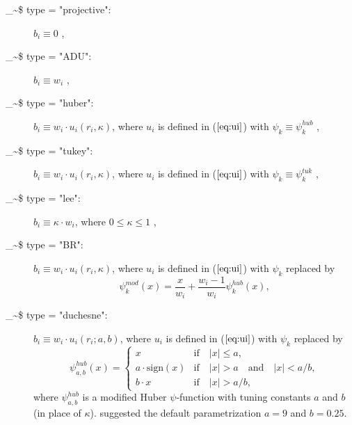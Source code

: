 \documentclass[a4paper,oneside,11pt,DIV=12]{scrartcl}
\makeatletter
\theoremstyle{remark}
\newcommand\code{\bgroup\@makeother\_\@makeother\~\@makeother\$\@makeother\^\@codex}
\def\@codex#1{{\normalfont\ttfamily\hyphenchar\font=-1 #1}\egroup}
\makeatother
\begin{document}
\begin{description}
    \item[\code{type = "projective":}] $b_i \equiv 0$
        \citep{sarndal_wright_1984},
    \item[\code{type = "ADU":}] $b_i \equiv w_i$ \citep[][Chapter
        6]{sarndal_swensson_etal_1992},
    \item[\code{type = "huber":}] $b_i \equiv w_i \cdot u_i(r_i,\kappa)$, where
        $u_i$ is defined in ($\ref{eq:ui}$) with $\psi_k \equiv \psi_k^{hub}$
        \citep{lee_1995,hulliger_1995,beaumont_alavi_2004},
    \item[\code{type = "tukey":}] $b_i \equiv w_i \cdot u_i(r_i, \kappa)$,
        where $u_i$ is defined in ($\ref{eq:ui}$) with $\psi_k \equiv
        \psi_k^{tuk}$ \citep{lee_1995,hulliger_1995,beaumont_alavi_2004},
    \item[\code{type = "lee":}] $b_i \equiv \kappa \cdot w_i$, where $0 \leq
        \kappa \leq 1$ \citep{lee_1991,lee_1995},
    \item[\code{type = "BR":}] $b_i \equiv w_i \cdot u_i(r_i,\kappa)$, where
        $u_i$ is defined in ($\ref{eq:ui}$) with $\psi_k$ replaced by
        \citep{beaumont_rivest_2009}
        \begin{equation*}
            \psi_k^{mod}(x) = \frac{x}{w_i} + \frac{w_i -
            1}{w_i}\psi_k^{hub}(x),
        \end{equation*}
    \item[\code{type = "duchesne":}] $b_i \equiv w_i \cdot u_i(r_i; a,b)$,
        where $u_i$ is defined in ($\ref{eq:ui}$) with $\psi_k$ replaced by
        \citep{duchesne_1999}
        \begin{equation*}
            \psi_{a,b}^{hub}(x) =
            \begin{cases} x & \text{if} \quad \vert x \vert \leq a, \\ a \cdot
                \mathrm{sign}(x) & \text{if} \quad \vert x \vert > a \quad
                \text{and} \quad \vert x \vert < a/b, \\ b \cdot x & \text{if}
                \quad \vert x \vert > a/b,
            \end{cases}
        \end{equation*}
        where $\psi_{a,b}^{hub}$ is a modified Huber $\psi$-function with
        tuning constants $a$ and $b$ (in place of $\kappa$).
        \citet{duchesne_1999} suggested the default parametrization $a=9$ and
        $b=0.25$.
\end{description}
\end{document}
